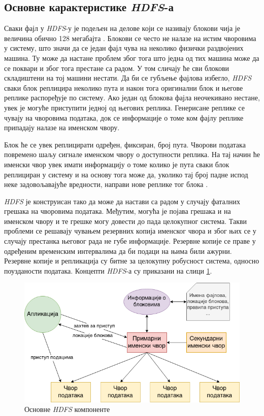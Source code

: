 \documentclass[12pt,oneside]{memoir}
\begin{document}
\subsection{Основне карактеристике \textit{HDFS}-а}
\label{subsec:hdfs_osobine}

Сваки фајл у \textit{HDFS}-у је подељен на делове који се називају блокови чија је величина обично 128 мегабајта \cite{hadoop_arch_guide}. Блокови се често не налазе на истим чворовима у систему, што значи да се један фајл чува на неколико физички раздвојених машина. Ту може да настане проблем због тога што једна од тих машина може да се поквари и због тога престане са радом. У том сличају ће сви блокови складиштени на тој машини нестати. Да би се губљење фајлова избегло, \textit{HDFS} сваки блок реплицира неколико пута и након тога оригинални блок и његове реплике распоређује по систему. Ако један од блокова фајла неочекивано нестане, увек је могуће приступити једној од његових реплика. Генерисане реплике се чувају на чворовима података, док се информације о томе ком фајлу реплике припадају налазе на именском чвору.

Блок ће се увек реплицирати одређен, фиксиран, број пута. Чворови података повремено шаљу сигнале именском чвору о доступности реплика. На тај начин ће именски чвор увек имати информацију о томе колико је пута сваки блок реплициран у систему и на основу тога може да, уколико тај број падне испод неке задовољавајуће вредности, направи нове реплике тог блока \cite{hadoop_arch_guide}.

\textit{HDFS} је конструисан тако да може да настави са радом у случају фаталних грешака на чворовима података. Међутим, могућа је појава грешака и на именском чвору и те грешке могу довести до пада целокупног система. Такви проблеми се решавају чувањем резервних копија именског чвора и због њих се у случају престанка његовог рада не губе информације. Резервне копије се праве у одређеним временским интервалима да би подаци на њима били ажурни. Резервне копије и репликација су битне за целокупну робусност система, односно поузданости података. Концепти \textit{HDFS}-а су приказани на слици \ref{fig:hadoop_sistem}.

\begin{figure}[!ht]
  \centering
  \includegraphics[width=1\textwidth]{pictures/hdfs_components_basic.png}
  \caption{Основне \textit{HDFS} компоненте}
  \label{fig:hadoop_sistem}
\end{figure}
\end{document}
